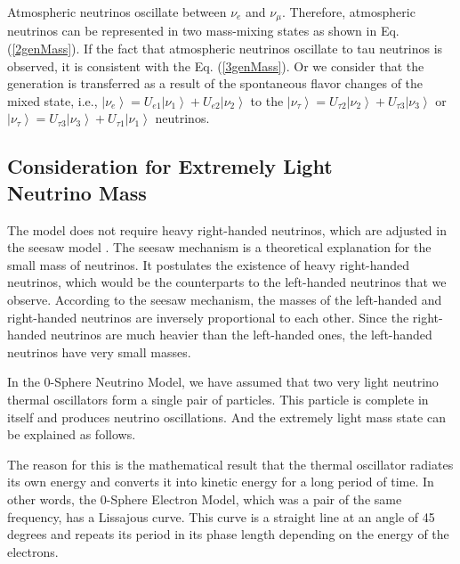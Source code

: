 \documentclass[%
 reprint,
 amsmath,amssymb,
 aps,
]{revtex4-1}
\numberwithin{equation}{section}%
\begin{document}
Atmospheric neutrinos oscillate \cite{Pontecorvo1967} between $\nu_e$ and $\nu_{\mu}$. Therefore, atmospheric neutrinos can be represented in two mass-mixing states as shown in Eq. (\ref{2genMass}). If the fact that atmospheric neutrinos oscillate \cite{Kajita1998} to tau neutrinos is observed, it is consistent with the Eq. (\ref{3genMass}). Or
we consider that the generation is transferred as a result of the spontaneous flavor changes of the mixed state, i.e., $\left|\nu_e\right\rangle=U_{e 1}\left|\nu_1\right\rangle+U_{e 2}\left|\nu_2\right\rangle$ to the $\left|\nu_\tau\right\rangle=U_{\tau 2}\left|\nu_2\right\rangle+U_{\tau 3}\left|\nu_3\right\rangle$ or $\left|\nu_\tau\right\rangle=U_{\tau 3}\left|\nu_3\right\rangle+U_{\tau 1}\left|\nu_1\right\rangle$ neutrinos.


\subsection{Consideration for Extremely Light \\Neutrino Mass}


The model does not require heavy right-handed neutrinos, which are adjusted in the seesaw model \cite{Yanagida}. The seesaw mechanism is a theoretical explanation for the small mass of neutrinos. It postulates the existence of heavy right-handed neutrinos, which would be the counterparts to the left-handed neutrinos that we observe. According to the seesaw mechanism, the masses of the left-handed and right-handed neutrinos are inversely proportional to each other. Since the right-handed neutrinos are much heavier than the left-handed ones, the left-handed neutrinos have very small masses.


In the 0-Sphere Neutrino Model, we have assumed that two very light neutrino thermal oscillators form a single pair of particles. This particle is complete in itself and produces neutrino oscillations. And the extremely light mass state can be explained as follows.

The reason for this is the mathematical result that the thermal oscillator radiates its own energy and converts it into kinetic energy for a long period of time. In other words, the 0-Sphere Electron Model, which was a pair of the same frequency, has a Lissajous curve. This curve is a straight line at an angle of 45 degrees and repeats its period in its phase length depending on the energy of the electrons.
\end{document}
